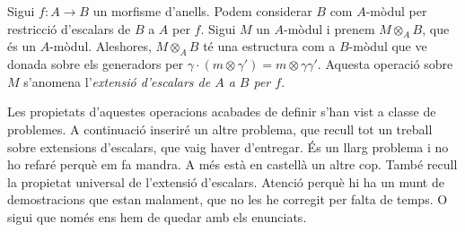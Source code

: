 \documentclass[../../../main.tex]{subfiles}
\begin{document}
\begin{defi}
\label{def:extensioEscalars} Sigui $f:A\to B$ un morfisme d'anells. Podem considerar $B$ com $A$-mòdul per restricció d'escalars de $B$ a $A$ per $f$. Sigui $M$ un $A$-mòdul i prenem $M\otimes_AB$, que és un $A$-mòdul. Aleshores, $M\otimes_AB$ té una estructura com a $B$-mòdul que ve donada sobre els generadors per $\gamma\cdotp(m\otimes\gamma')=m\otimes\gamma\gamma'$. Aquesta operació sobre $M$ s'anomena l'\textit{extensió d'escalars de $A$ a $B$ per $f$}.
\end{defi}

Les propietats d'aquestes operacions acabades de definir s'han vist a classe de problemes. A continuació inseriré un altre problema, que recull tot un treball sobre extensions d'escalars, que vaig haver d'entregar. És un llarg problema i no ho refaré perquè em fa mandra. A més està en castellà un altre cop. També recull la propietat universal de l'extensió d'escalars. Atenció perquè hi ha un munt de demostracions que estan malament, que no les he corregit per falta de temps. O sigui que només ens hem de quedar amb els enunciats.
\end{document}
